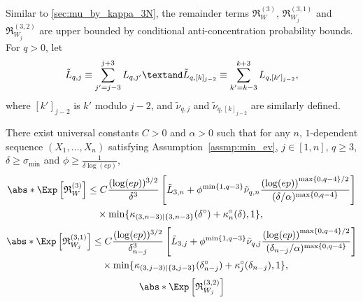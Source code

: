\documentclass[aos]{imsart}
\begin{document}
\begin{appendix}
\medskip
{} Similar to \cref{sec:mu_by_kappa_3N}, the remainder terms $\mathfrak{R}_{W}^{(3)}$, $\mathfrak{R}_{W_j}^{(3,1)}$ and $\mathfrak{R}_{W_j}^{(3,2)}$ are upper bounded by conditional anti-concentration probability bounds. For $q > 0$, let
\begin{equation*}
    \tilde{L}_{q,j} \equiv \sum_{j'=j-3}^{j+3} L_{q,j'} \textand 
    \tilde{L}_{q,[k]_{j-2}} \equiv \sum_{k'=k-3}^{k+3} L_{q,[k']_{j-2}},
\end{equation*}
where $[k']_{j-2}$ is $k'$ modulo $j-2$, and $\tilde{\nu}_{q,j}$ and $\tilde{\nu}_{q,[k]_{j-2}}$ are similarly defined.

\begin{lemma} \label{thm:remainder_lemma_3P}
    There exist universal constants $C > 0$ and $\alpha > 0$ such that for any $n$, $1$-dependent sequence $(X_1, \dots, X_n)$ satisfying Assumption~\eqref{assmp:min_ev}, $j \in [1,n]$, $q \geq 3$, $\delta \geq \sigma_{\min}$ and $\phi \geq \frac{1}{\delta \log(ep)}$,
    \begin{equation*}
    \begin{aligned}
        \abs*{\Exp \left[ \mathfrak{R}_{W}^{(3)} \right]} 
        & \leq C \frac{(\log(ep))^{3/2}}{\delta^3}
        \left[ 
            \tilde{L}_{3,n} 
            + \phi^{\min\{1, q-3\}} \tilde\nu_{q,n} \frac{ {(\log(ep))}^{\max\{0, q-4\}/2}}{(\delta/\alpha)^{\max\{0, q-4\}}}
        \right] \\
        & \quad \times \min\{\kappa_{(3,n-3)|\{3,n-3\}}(\delta^\circ) + \kappa^\circ_{n}(\delta), 1\},
    \end{aligned}
    \end{equation*}
    \begin{equation*}
    \begin{aligned}
        \abs*{\Exp \left[ \mathfrak{R}_{W_j}^{(3,1)} \right]} 
        & \leq C \frac{(\log(ep))^{3/2}}{\delta_{n-j}^3}
        \left[ 
            \tilde{L}_{3,j} 
            + \phi^{\min\{1, q-3\}} \tilde\nu_{q,j} \frac{ {(\log(ep))}^{\max\{0, q-4\}/2}}{(\delta_{n-j}/\alpha)^{\max\{0, q-4\}}}
        \right] \\
        & \quad \times \min\{\kappa_{(3,j-3)|\{3,j-3\}}(\delta_{n-j}^\circ) + \kappa^\circ_{j}(\delta_{n-j}), 1\},
    \end{aligned}
    \end{equation*}
    \begin{equation*}
    \begin{aligned}
        \abs*{\Exp \left[ \mathfrak{R}_{W_j}^{(3,2)} \right]}

\end{aligned}
\end{equation*}
\end{lemma}
\end{appendix}
\end{document}
